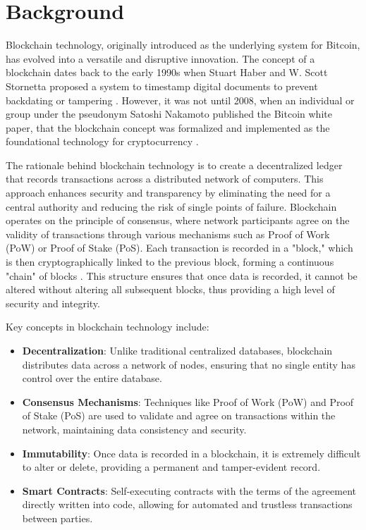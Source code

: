 \documentclass[../main.tex]{subfiles}
\begin{document}
\section{Background}\label{sec:background}

Blockchain technology, originally introduced as the underlying system for Bitcoin, has evolved into a versatile and disruptive innovation. The concept of a blockchain dates back to the early 1990s when Stuart Haber and W. Scott Stornetta proposed a system to timestamp digital documents to prevent backdating or tampering \cite{HaberStornetta1991}. However, it was not until 2008, when an individual or group under the pseudonym Satoshi Nakamoto published the Bitcoin white paper, that the blockchain concept was formalized and implemented as the foundational technology for cryptocurrency \cite{Nakamoto2008}.

The rationale behind blockchain technology is to create a decentralized ledger that records transactions across a distributed network of computers. This approach enhances security and transparency by eliminating the need for a central authority and reducing the risk of single points of failure. Blockchain operates on the principle of consensus, where network participants agree on the validity of transactions through various mechanisms such as Proof of Work (PoW) or Proof of Stake (PoS). Each transaction is recorded in a "block," which is then cryptographically linked to the previous block, forming a continuous "chain" of blocks \cite{Bayer1993}. This structure ensures that once data is recorded, it cannot be altered without altering all subsequent blocks, thus providing a high level of security and integrity.

Key concepts in blockchain technology include:

\begin{itemize}
    \item \textbf{Decentralization}: Unlike traditional centralized databases, blockchain distributes data across a network of nodes, ensuring that no single entity has control over the entire database.
    \item \textbf{Consensus Mechanisms}: Techniques like Proof of Work (PoW) and Proof of Stake (PoS) are used to validate and agree on transactions within the network, maintaining data consistency and security.
    \item \textbf{Immutability}: Once data is recorded in a blockchain, it is extremely difficult to alter or delete, providing a permanent and tamper-evident record.
    \item \textbf{Smart Contracts}: Self-executing contracts with the terms of the agreement directly written into code, allowing for automated and trustless transactions between parties.
\end{itemize}
\end{document}
